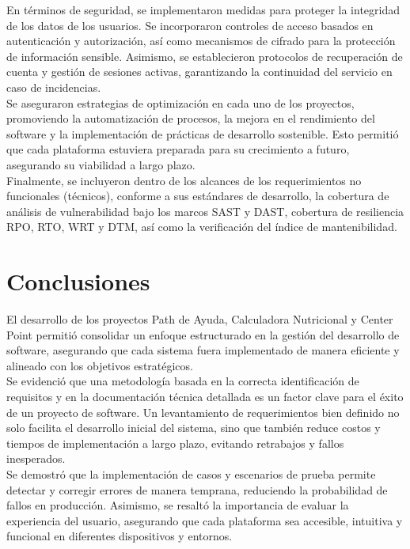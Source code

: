 \documentclass[12pt,letterpaper,spanish, xcolor=table]{report}
\numberwithin{figure}{subsection}
\begin{document}
	En términos de seguridad, se implementaron medidas para proteger la integridad de los datos de los usuarios. Se incorporaron controles de acceso basados en autenticación y autorización, así como mecanismos de cifrado para la protección de información sensible. Asimismo, se establecieron protocolos de recuperación de cuenta y gestión de sesiones 
    activas, garantizando la continuidad del servicio en caso de incidencias.\\
    
    Se aseguraron estrategias de optimización en cada uno de los proyectos, promoviendo la automatización de procesos, la mejora en el rendimiento del software y la implementación de prácticas de desarrollo sostenible. Esto permitió que cada plataforma estuviera preparada para su crecimiento a futuro, asegurando su viabilidad a largo plazo.\\
    
    Finalmente, se incluyeron dentro de los alcances de los requerimientos no funcionales (técnicos), conforme a sus estándares de desarrollo, la cobertura de análisis de vulnerabilidad bajo los marcos SAST y DAST, cobertura de resiliencia RPO, RTO, WRT y DTM, así como la verificación del índice de mantenibilidad.\\
    
    \newpage

\section{Conclusiones}

	El desarrollo de los proyectos Path de Ayuda, Calculadora Nutricional y Center Point permitió consolidar un enfoque estructurado en la gestión del desarrollo de software, asegurando que cada sistema fuera implementado de manera eficiente y alineado con los objetivos estratégicos.\\
	
	Se evidenció que una metodología basada en la correcta identificación de requisitos y en la documentación técnica detallada es un factor clave para el éxito de un proyecto de software. Un levantamiento de requerimientos bien definido no solo facilita el desarrollo inicial del sistema, sino que también reduce costos y tiempos de implementación a largo plazo, evitando retrabajos y fallos inesperados.\\
	
	Se demostró que la implementación de casos y escenarios de prueba permite detectar y corregir errores de manera temprana, reduciendo la probabilidad de fallos en producción. Asimismo, se resaltó la importancia de evaluar la experiencia del usuario, asegurando que cada plataforma sea accesible, intuitiva y funcional en diferentes dispositivos y entornos.\\
	
\end{document}
